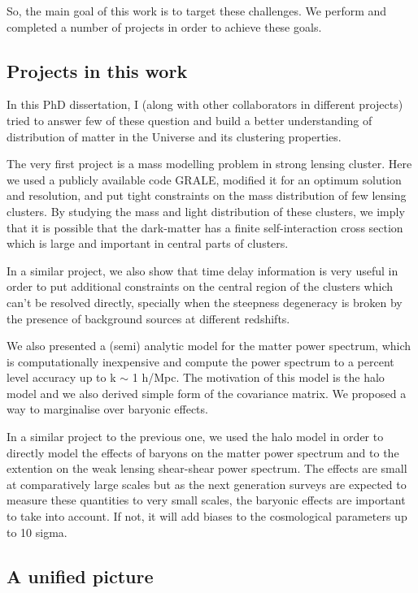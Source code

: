 So, the main goal of this work is to target these challenges. We perform and completed
a number of projects in order to achieve these goals. 


\subsection{Projects in this work}

In this PhD dissertation, I (along with other collaborators in different projects) tried
to answer few of these question and build a better understanding of distribution of 
matter in the Universe and its clustering properties. 

The very first project is a mass modelling problem in strong lensing cluster. Here we
used a publicly available code GRALE, modified it for an optimum solution and resolution,
and put tight constraints on the mass distribution of few lensing clusters. By studying
the mass and light distribution of these clusters, we imply that it is possible 
that the dark-matter has a finite self-interaction cross section which is large and
important in central parts of clusters. 

In a similar project, we also show that time delay information is very useful in 
order to put additional constraints on the central region of the clusters which can't 
be resolved directly, specially when the steepness degeneracy is broken by the 
presence of background sources at different redshifts.

We also presented a (semi) analytic model for the matter power spectrum, which is
computationally inexpensive and compute the power spectrum to a percent level 
accuracy up to k $\sim$ 1 h/Mpc. The motivation of this model is the halo model
and we also derived simple form of the covariance matrix. We proposed a way to 
marginalise over baryonic effects. 

In a similar project to the previous one, we used the halo model in order to directly
model the effects of baryons on the matter power spectrum and to the extention on the
weak lensing shear-shear power spectrum. The effects are small at comparatively large
scales but as the next generation surveys are expected to measure these quantities 
to very small scales, the baryonic effects are important to take into account. If not, 
it will add biases to the cosmological parameters up to 10 sigma. 

\subsection{A unified picture}

